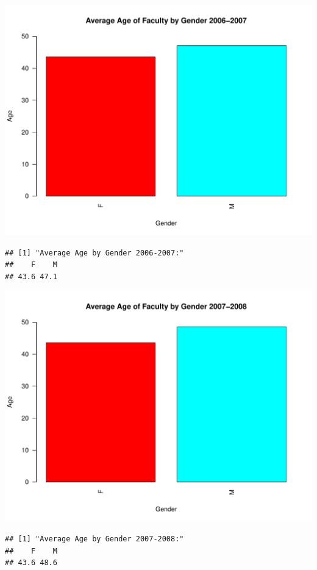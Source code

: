 \documentclass[12pt,a4paper]{article}\usepackage[]{graphicx}\usepackage[]{color}
\makeatletter
\def\maxwidth{ %
  \ifdim\Gin@nat@width>\linewidth
    \linewidth
  \else
    \Gin@nat@width
  \fi
}
\newenvironment{kframe}{%
 \def\at@end@of@kframe{}%
 \ifinner\ifhmode%
  \def\at@end@of@kframe{\end{minipage}}%
  \begin{minipage}{\columnwidth}%
 \fi\fi%
 \def\FrameCommand##1{\hskip\@totalleftmargin \hskip-\fboxsep
 \colorbox{shadecolor}{##1}\hskip-\fboxsep
     \hskip-\linewidth \hskip-\@totalleftmargin \hskip\columnwidth}%
 \MakeFramed {\advance\hsize-\width
   \@totalleftmargin\z@ \linewidth\hsize
   \@setminipage}}%
 {\par\unskip\endMakeFramed%
 \at@end@of@kframe}
\newenvironment{knitrout}{}{} %
\theoremstyle{definition}
\makeatother
\begin{document}
\begin{knitrout}
\begin{kframe}
\end{kframe}
\includegraphics[width=\maxwidth]{figure/unnamed-chunk-10-3} 
\begin{kframe}\begin{verbatim}
## [1] "Average Age by Gender 2006-2007:"
##    F    M 
## 43.6 47.1
\end{verbatim}
\end{kframe}
\includegraphics[width=\maxwidth]{figure/unnamed-chunk-10-4} 
\begin{kframe}\begin{verbatim}
## [1] "Average Age by Gender 2007-2008:"
##    F    M 
## 43.6 48.6
\end{verbatim}
\end{kframe}

\end{knitrout}
\end{document}
